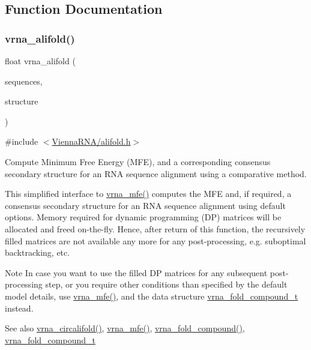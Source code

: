 \subsection{Function Documentation}
\mbox{\label{group__consensus__mfe__fold_ga6c9d3bef3e92c6d423ffac9f981418c1}} 
\subsubsection{\texorpdfstring{vrna\+\_\+alifold()}{vrna\_alifold()}}
{\footnotesize\ttfamily float vrna\+\_\+alifold (\begin{DoxyParamCaption}\item[{const char $\ast$$\ast$}]{sequences,  }\item[{char $\ast$}]{structure }\end{DoxyParamCaption})}



{\ttfamily \#include $<$\mbox{\hyperlink{alifold_8h}{Vienna\+R\+N\+A/alifold.\+h}}$>$}



Compute Minimum Free Energy (M\+FE), and a corresponding consensus secondary structure for an R\+NA sequence alignment using a comparative method. 

This simplified interface to \mbox{\hyperlink{group__mfe__fold_gabd3b147371ccf25c577f88bbbaf159fd}{vrna\+\_\+mfe()}} computes the M\+FE and, if required, a consensus secondary structure for an R\+NA sequence alignment using default options. Memory required for dynamic programming (DP) matrices will be allocated and free\textquotesingle{}d on-\/the-\/fly. Hence, after return of this function, the recursively filled matrices are not available any more for any post-\/processing, e.\+g. suboptimal backtracking, etc.

\begin{DoxyNote}{Note}
In case you want to use the filled DP matrices for any subsequent post-\/processing step, or you require other conditions than specified by the default model details, use \mbox{\hyperlink{group__mfe__fold_gabd3b147371ccf25c577f88bbbaf159fd}{vrna\+\_\+mfe()}}, and the data structure \mbox{\hyperlink{group__fold__compound_ga1b0cef17fd40466cef5968eaeeff6166}{vrna\+\_\+fold\+\_\+compound\+\_\+t}} instead.
\end{DoxyNote}
\begin{DoxySeeAlso}{See also}
\mbox{\hyperlink{group__consensus__mfe__fold_ga17a1be7490468c29c335ba9bffacba53}{vrna\+\_\+circalifold()}}, \mbox{\hyperlink{group__mfe__fold_gabd3b147371ccf25c577f88bbbaf159fd}{vrna\+\_\+mfe()}}, \mbox{\hyperlink{group__fold__compound_ga6601d994ba32b11511b36f68b08403be}{vrna\+\_\+fold\+\_\+compound()}}, \mbox{\hyperlink{group__fold__compound_ga1b0cef17fd40466cef5968eaeeff6166}{vrna\+\_\+fold\+\_\+compound\+\_\+t}}
\end{DoxySeeAlso}

